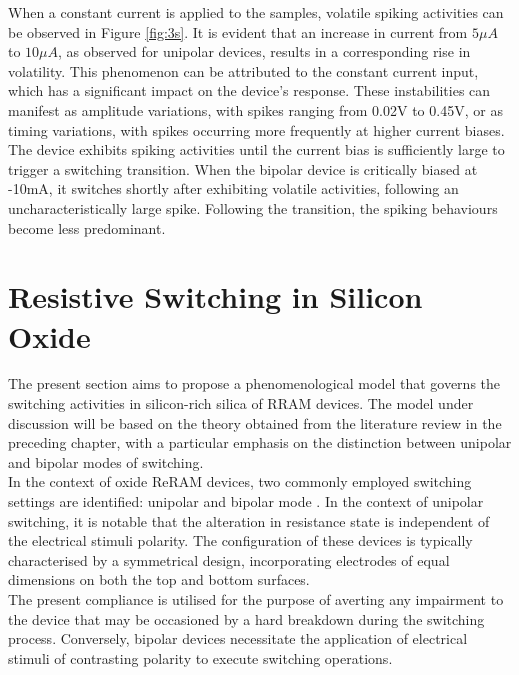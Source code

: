 \noindent When a constant current is applied to the samples, volatile spiking activities can be observed in Figure \ref{fig:3s}. It is evident that an increase in current from $5\mu A$ to $10 \mu A$, as observed for unipolar devices, results in a corresponding rise in volatility. This phenomenon can be attributed to the constant current input, which has a significant impact on the device's response. These instabilities can manifest as amplitude variations, with spikes ranging from 0.02V to 0.45V, or as timing variations, with spikes occurring more frequently at higher current biases.\\

\noindent The device exhibits spiking activities until the current bias is sufficiently large to trigger a switching transition. When the bipolar device is critically biased at -10mA, it switches shortly after exhibiting volatile activities, following an uncharacteristically large spike. Following the transition, the spiking behaviours become less predominant.

\section[Resistive Switching in Silicon Oxide]{Resistive Switching in Silicon Oxide}

\noindent The present section aims to propose a phenomenological model that governs the switching activities in silicon-rich silica of RRAM devices. The model under discussion will be based on the theory obtained from the literature review in the preceding chapter, with a particular emphasis on the distinction between unipolar and bipolar modes of switching. \\

\noindent  In the context of oxide ReRAM devices, two commonly employed switching settings are identified: unipolar and bipolar mode \cite{zhuge2013advances}. In the context of unipolar switching, it is notable that the alteration in resistance state is independent of the electrical stimuli polarity. The configuration of these devices is typically characterised by a symmetrical design, incorporating electrodes of equal dimensions on both the top and bottom surfaces. \\

\noindent The present compliance is utilised for the purpose of averting any impairment to the device that may be occasioned by a hard breakdown during the switching process.  Conversely, bipolar devices necessitate the application of electrical stimuli of contrasting polarity to execute switching operations.

